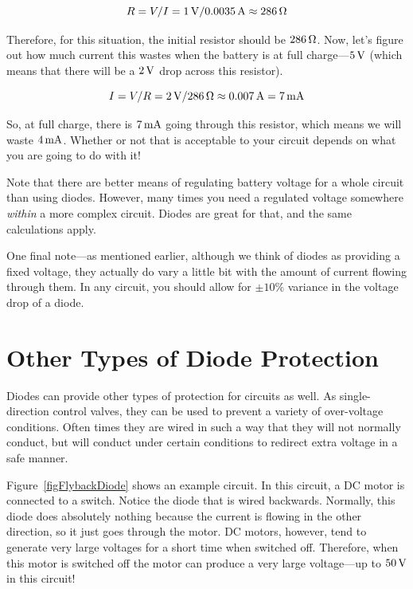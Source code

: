 $$ R = V / I = 1\,\si{\volt} / 0.0035\,\si{\ampere} \approx 286\,\si{\ohm} $$

Therefore, for this situation, the initial resistor should be $286\,\si{\ohm}$.
Now, let's figure out how much current this wastes when the battery is at full charge---$5\,\si{\volt}$ (which means that there will be a $2\,\si{\volt}$ drop across this resistor).

$$ I = V / R = 2\,\si{\volt} / 286\,\si{\ohm} \approx 0.007\,\si{\ampere} = 7\,\si{\milli\ampere} $$

So, at full charge, there is $7\,\si{\milli\ampere}$ going through this resistor, which means we will waste $4\,\si{\milli\ampere}$.  
Whether or not that is acceptable to your circuit depends on what you are going to do with it!

Note that there are better means of regulating battery voltage for a whole circuit than using diodes.
However, many times you need a regulated voltage somewhere \emph{within} a more complex circuit.
Diodes are great for that, and the same calculations apply.

One final note---as mentioned earlier, although we think of diodes as providing a fixed voltage, they actually do vary a little bit with the amount of current flowing through them.
In any circuit, you should allow for $\pm 10\%$ variance in the voltage drop of a diode.

\section{Other Types of Diode Protection}

Diodes can provide other types of protection for circuits as well.
As single-direction control valves, they can be used to prevent a variety of over-voltage conditions.
Often times they are wired in such a way that they will not normally conduct, but will conduct under certain conditions to redirect extra voltage in a safe manner.

Figure~\ref{figFlybackDiode} shows an example circuit.
In this circuit, a DC motor is connected to a switch.
Notice the diode that is wired backwards.
Normally, this diode does absolutely nothing because the current is flowing in the other direction, so it just goes through the motor.
DC motors, however, tend to generate very large voltages for a short time when switched off.
Therefore, when this motor is switched off the motor can produce a very large voltage---up to $50\,\si{\volt}$ in this circuit!


